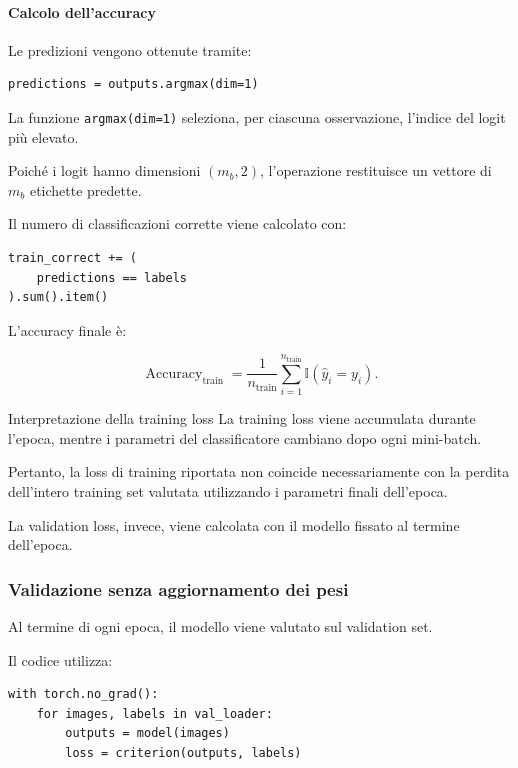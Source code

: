 \documentclass[10pt,a4paper,oneside]{book}
\begin{document}
\paragraph{Calcolo dell'accuracy}

Le predizioni vengono ottenute tramite:

\begin{verbatim}
predictions = outputs.argmax(dim=1)
\end{verbatim}

La funzione \texttt{argmax(dim=1)} seleziona,
per ciascuna osservazione, l'indice del logit
più elevato.

Poiché i logit hanno dimensioni
$(m_b,2)$, l'operazione restituisce
un vettore di $m_b$ etichette predette.

Il numero di classificazioni corrette viene
calcolato con:

\begin{verbatim}
train_correct += (
    predictions == labels
).sum().item()
\end{verbatim}

L'accuracy finale è:

\[
\operatorname{Accuracy}_{\mathrm{train}}
=
\frac{1}{n_{\mathrm{train}}}
\sum_{i=1}^{n_{\mathrm{train}}}
\mathbb{I}(\hat y_i=y_i).
\]

\begin{warningbox}{Interpretazione della training loss}
La training loss viene accumulata durante l'epoca,
mentre i parametri del classificatore cambiano
dopo ogni mini-batch.

Pertanto, la loss di training riportata
non coincide necessariamente con la perdita
dell'intero training set valutata utilizzando
i parametri finali dell'epoca.

La validation loss, invece, viene calcolata
con il modello fissato al termine dell'epoca.
\end{warningbox}

\subsubsection{Validazione senza aggiornamento dei pesi}

Al termine di ogni epoca, il modello viene
valutato sul validation set.

Il codice utilizza:

\begin{verbatim}
with torch.no_grad():
    for images, labels in val_loader:
        outputs = model(images)
        loss = criterion(outputs, labels)
\end{verbatim}
\end{document}
